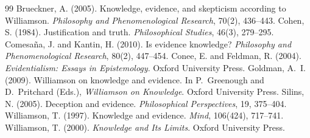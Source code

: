 \documentclass{situationist-preprint}
\begin{document}
\begin{thebibliography}{99}\small
{} Brueckner, A. (2005). Knowledge, evidence, and skepticism according to Williamson. \emph{Philosophy and Phenomenological Research}, 70(2), 436--443.
 Cohen, S. (1984). Justification and truth. \emph{Philosophical Studies}, 46(3), 279--295.
 Comesa\~na, J. and Kantin, H. (2010). Is evidence knowledge? \emph{Philosophy and Phenomenological Research}, 80(2), 447--454.
 Conee, E. and Feldman, R. (2004). \emph{Evidentialism: Essays in Epistemology}. Oxford University Press.
 Goldman, A.~I. (2009). Williamson on knowledge and evidence. In P.~Greenough and D.~Pritchard (Eds.), \emph{Williamson on Knowledge}. Oxford University Press.
 Silins, N. (2005). Deception and evidence. \emph{Philosophical Perspectives}, 19, 375--404.
 Williamson, T. (1997). Knowledge and evidence. \emph{Mind}, 106(424), 717--741.
 Williamson, T. (2000). \emph{Knowledge and Its Limits}. Oxford University Press.
\end{thebibliography}
\end{document}
